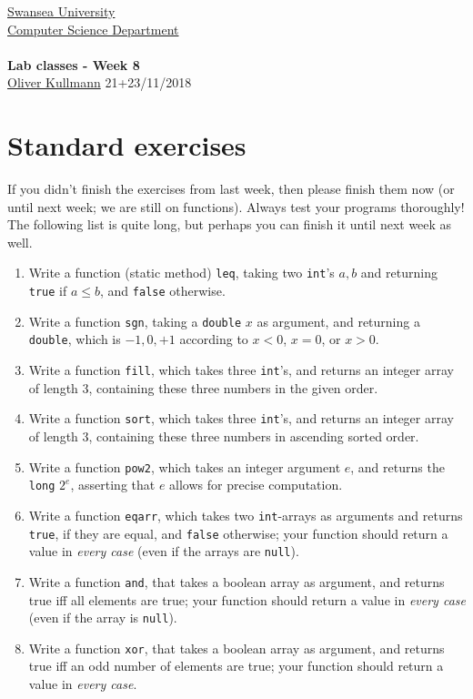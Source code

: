\documentclass[11pt]{article}
\newcommand{\Java}{\lstset{language=Java,keywordstyle=\bfseries,breaklines,breakindent=30pt}}
\begin{document}
\begin{center}
  \href{http://www.swan.ac.uk/}{Swansea University}\\
  \href{http://www.swan.ac.uk/compsci/}{Computer Science Department}\\[1ex]
  \href{\chp}{\module}\\[1ex]
  \textbf{Lab classes - Week 8}\\
  \href{http://cs.swan.ac.uk/~csoliver}{Oliver Kullmann} 21+23/11/2018
\end{center}


\section{Standard exercises}
\label{sec:stdex}

\Java

If you didn't finish the exercises from last week, then please finish them now (or until next week; we are still on functions). Always test your programs thoroughly! The following list is quite long, but perhaps you can finish it until next week as well.

\begin{enumerate}
\item Write a function (static method) \texttt{leq}, taking two \texttt{int}'s $a, b$ and returning \texttt{true} if $a \le b$, and \texttt{false} otherwise.
\item Write a function \texttt{sgn}, taking a \texttt{double} $x$ as argument, and returning a \texttt{double}, which is $-1, 0 , +1$ according to $x < 0$, $x = 0$, or $x > 0$.
\item Write a function \texttt{fill}, which takes three \texttt{int}'s, and returns an integer array of length $3$, containing these three numbers in the given order.
\item Write a function \texttt{sort}, which takes three \texttt{int}'s, and returns an integer array of length $3$, containing these three numbers in ascending sorted order.
\item Write a function \texttt{pow2}, which takes an integer argument $e$, and returns the \texttt{long} $2^e$, asserting that $e$ allows for precise computation.
\item Write a function \texttt{eqarr}, which takes two \texttt{int}-arrays as arguments and returns \texttt{true}, if they are equal, and \texttt{false} otherwise; your function should return a value in \emph{every case} (even if the arrays are \texttt{null}).
\item Write a function \texttt{and}, that takes a boolean array as argument, and returns true iff all elements are true; your function should return a value in \emph{every case} (even if the array is \texttt{null}).
\item Write a function \texttt{xor}, that takes a boolean array as argument, and returns true iff an odd number of elements are true; your function should return a value in \emph{every case}.
\end{enumerate}
\end{document}
